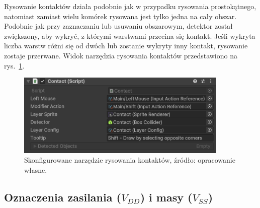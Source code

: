 Rysowanie kontaktów działa podobnie jak w przypadku rysowania prostokątnego,
natomiast zamiast wielu komórek rysowana jest tylko jedna na cały obszar.
Podobnie jak przy zaznaczaniu lub usuwaniu obszarowym,
detektor został zwiększony, aby wykryć,
z którymi warstwami przecina się kontakt.
Jeśli wykryta liczba warstw różni się od dwóch lub zostanie wykryty inny kontakt,
rysowanie zostaje przerwane.
Widok narzędzia rysowania kontaktów przedstawiono na rys.~\ref{fig:contact}.

\begin{figure}[h!]
    \centering
    \includegraphics[width=0.9\textwidth]{chapters/chapter4/rys/tools/contact}
    \caption[Skonfigurowane narzędzie rysowania kontaktów.]
        {Skonfigurowane narzędzie rysowania kontaktów, źródło: opracowanie własne.}
    \label{fig:contact}
\end{figure}

\subsection{Oznaczenia zasilania ($V_{DD}$) i masy ($V_{SS}$)}
\label{subsec:oznaczenia_zasilania}

